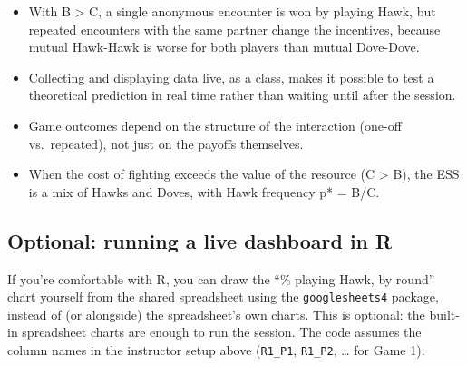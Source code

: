 \documentclass[
  a4paper]{book}
\providecommand{\tightlist}{%
  \setlength{\itemsep}{0pt}\setlength{\parskip}{0pt}}
\begin{document}
\begin{itemize}
\tightlist
\item
  With B \textgreater{} C, a single anonymous encounter is won by playing Hawk, but repeated encounters with the same partner change the incentives, because mutual Hawk-Hawk is worse for both players than mutual Dove-Dove.
\item
  Collecting and displaying data live, as a class, makes it possible to test a theoretical prediction in real time rather than waiting until after the session.
\item
  Game outcomes depend on the structure of the interaction (one-off vs.~repeated), not just on the payoffs themselves.
\item
  When the cost of fighting exceeds the value of the resource (C \textgreater{} B), the ESS is a mix of Hawks and Doves, with Hawk frequency p* = B/C.
\end{itemize}

\subsection{Optional: running a live dashboard in R}\label{optional-running-a-live-dashboard-in-r}

If you're comfortable with R, you can draw the ``\% playing Hawk, by round'' chart yourself from the shared spreadsheet using the \texttt{googlesheets4} package, instead of (or alongside) the spreadsheet's own charts. This is optional: the built-in spreadsheet charts are enough to run the session. The code assumes the column names in the instructor setup above (\texttt{R1\_P1}, \texttt{R1\_P2}, \ldots{} for Game 1).
\end{document}
